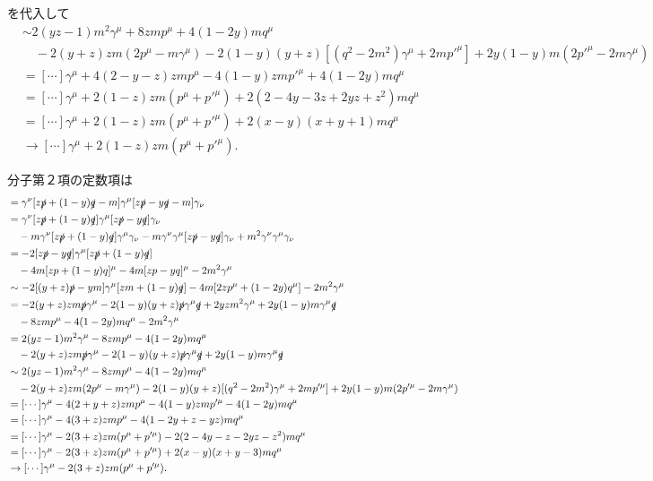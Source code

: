 を代入して
\begin{align*}
  &\sim 2(yz-1) m^2\gamma^\mu + 8zmp^\mu + 4(1-2y)mq^\mu \\
  &\quad -2(y+z)zm (2p^\mu - m\gamma^\mu) - 2(1-y)(y+z) [(q^2-2m^2) \gamma^\mu + 2mp'^\mu] + 2y(1-y)m (2p'^\mu - 2m\gamma^\mu) \\
  &= [\cdots] \gamma^\mu + 4(2-y-z)zmp^\mu - 4(1-y)zmp'^\mu + 4(1-2y)mq^\mu \\
  &= [\cdots] \gamma^\mu + 2(1-z)zm(p^\mu+p'^\mu) + 2(2-4y-3z+2yz+z^2)mq^\mu \\
  &= [\cdots] \gamma^\mu + 2(1-z)zm(p^\mu+p'^\mu) + 2(x-y)(x+y+1)mq^\mu \\
  &\to [\cdots] \gamma^\mu + 2(1-z)zm(p^\mu+p'^\mu) .
\end{align*}

分子第２項の定数項は
\begin{align*}
  &= \gamma^\nu [z\slashed{p}+(1-y)\slashed{q}-m] \gamma^\mu [z\slashed{p}-y\slashed{q}-m] \gamma_\nu \\
  &= \gamma^\nu [z\slashed{p}+(1-y)\slashed{q}] \gamma^\mu [z\slashed{p}-y\slashed{q}] \gamma_\nu \\
  &\quad - m \gamma^\nu [z\slashed{p}+(1-y)\slashed{q}] \gamma^\mu \gamma_\nu
  - m \gamma^\nu \gamma^\mu [z\slashed{p}-y\slashed{q}] \gamma_\nu
  + m^2\gamma^\nu \gamma^\mu \gamma_\nu \\
  &= -2 [z\slashed{p}-y\slashed{q}] \gamma^\mu [z\slashed{p}+(1-y)\slashed{q}] \\
  &\quad - 4m [zp+(1-y)q]^\mu - 4m [zp-yq]^\mu - 2m^2 \gamma^\mu \\
  &\sim -2 [(y+z)\slashed{p}-ym] \gamma^\mu [zm+(1-y)\slashed{q}] - 4m [2zp^\mu+(1-2y)q^\mu] - 2m^2 \gamma^\mu \\
  &= -2(y+z)zm\slashed{p}\gamma^\mu - 2(1-y)(y+z)\slashed{p}\gamma^\mu\slashed{q} + 2yzm^2\gamma^\mu + 2y(1-y)m \gamma^\mu\slashed{q} \\
  &\quad - 8zmp^\mu - 4(1-2y)mq^\mu - 2m^2 \gamma^\mu \\
  &= 2(yz-1) m^2\gamma^\mu - 8zmp^\mu - 4(1-2y)mq^\mu \\
  &\quad -2(y+z)zm\slashed{p}\gamma^\mu - 2(1-y)(y+z)\slashed{p}\gamma^\mu\slashed{q} + 2y(1-y)m \gamma^\mu\slashed{q} \\
  &\sim 2(yz-1) m^2\gamma^\mu - 8zmp^\mu - 4(1-2y)mq^\mu \\
  &\quad -2(y+z)zm (2p^\mu - m\gamma^\mu) - 2(1-y)(y+z) [(q^2-2m^2) \gamma^\mu + 2mp'^\mu] + 2y(1-y)m (2p'^\mu - 2m\gamma^\mu) \\
  &= [\cdots] \gamma^\mu - 4(2+y+z)zmp^\mu - 4(1-y)zmp'^\mu - 4(1-2y)mq^\mu \\
  &= [\cdots] \gamma^\mu - 4(3+z)zmp^\mu - 4(1-2y+z-yz)mq^\mu \\
  &= [\cdots] \gamma^\mu - 2(3+z)zm(p^\mu+p'^\mu) - 2(2-4y-z-2yz-z^2)mq^\mu \\
  &= [\cdots] \gamma^\mu - 2(3+z)zm(p^\mu+p'^\mu) + 2(x-y)(x+y-3) mq^\mu \\
  &\to [\cdots] \gamma^\mu - 2(3+z)zm(p^\mu+p'^\mu) .
\end{align*}

